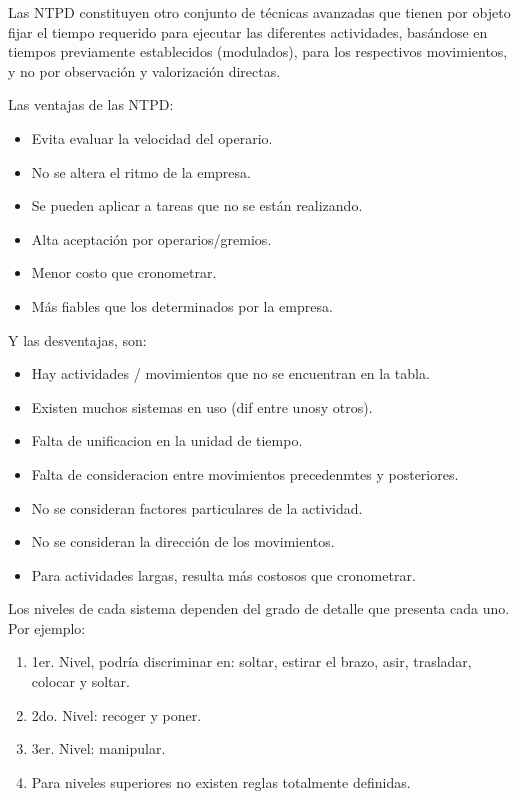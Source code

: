 \documentclass[a4paper,oneside,11pt]{article}
\begin{document}
Las NTPD constituyen otro conjunto de técnicas avanzadas que tienen por objeto fijar el tiempo requerido para ejecutar las diferentes actividades, basándose en tiempos previamente establecidos (modulados), para los respectivos movimientos, y no por observación y valorización directas.

Las ventajas de las NTPD:
\begin{itemize}
    \item Evita evaluar la velocidad del operario.
    \item No se altera el ritmo de la empresa.
    \item Se pueden aplicar a tareas que no se están realizando.
    \item Alta aceptación por operarios/gremios.
    \item Menor costo que cronometrar.
    \item Más fiables que los determinados por la empresa.
\end{itemize}

Y las desventajas, son:
\begin{itemize}
    \item Hay actividades / movimientos que no se encuentran en la tabla.
    \item Existen muchos sistemas en uso (dif entre unosy otros).
    \item Falta de unificacion en la unidad de tiempo.
    \item Falta de consideracion entre movimientos precedenmtes y posteriores.
    \item No se consideran factores particulares de la actividad.
    \item No se consideran la dirección de los movimientos.
    \item Para actividades largas, resulta más costosos que cronometrar.
\end{itemize}

Los niveles de cada sistema dependen del grado de detalle que presenta cada uno. Por ejemplo:
\begin{enumerate}
    \item 1er. Nivel, podría discriminar en: soltar, estirar el brazo, asir, trasladar, colocar y soltar. 
    \item 2do. Nivel: recoger y poner.
    \item 3er. Nivel: manipular. 
    \item Para niveles superiores no existen reglas totalmente definidas.
\end{enumerate}
\end{document}
